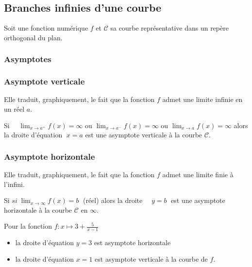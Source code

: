 \begin{example}
\subsection{Branches infinies d'une courbe}
Soit une fonction numérique $ f $ et $ \mathcal{C} $ sa courbe représentative dans un repère orthogonal du plan.
\subsubsection{Asymptotes}
\subsubsection*{Asymptote verticale}
Elle traduit, graphiquement, le fait que la fonction $f$ admet une limite infinie en un réel $a$.


\begin{definition}
Si $\quad \displaystyle\lim_{x \to a^{+}}f(x)=\infty$  ou 
$\displaystyle\lim_{x \to a^{-}}f(x)=\infty $  ou 
$\displaystyle\lim_{x \to a}f(x)=\infty $ alors  la droite  d'équation $\; x=a$ est une asymptote verticale à la courbe $\mathcal{C} $.
\end{definition}



\subsubsection*{Asymptote horizontale}
Elle traduit, graphiquement, le fait que la fonction $f$ admet une limite finie à l'infini.



\begin{definition}
Si $si\;\displaystyle \lim_{x \to \infty}f(x)=b \;$ (réel) alors  la droite  $\quad y = b \;$  est une  asymptote horizontale à  la courbe $\mathcal{C} $   en $\infty$.
\end{definition}

\begin{example}
Pour la fonction $f : x\mapsto 3+ \frac{5}{x-1} $ 
\begin{itemize}
\item la droite d'équation   $y = 3 $ est asymptote  horizontale  
\item la droite d'équation $x = 1$ est asymptote verticale à la courbe de $f.$
\end{itemize}
\end{example}


\end{example}
